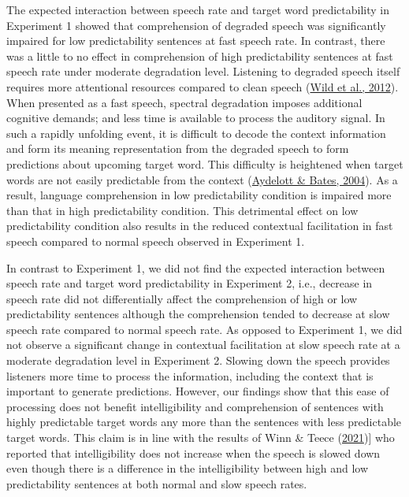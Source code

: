 \documentclass[a4paper, nobind]{templates/ociamthesis}
\begin{document}
The expected interaction between speech rate and target word predictability in Experiment 1 showed that comprehension of degraded speech was significantly impaired for low predictability sentences at fast speech rate. In contrast, there was a little to no effect in comprehension of high predictability sentences at fast speech rate under moderate degradation level.
Listening to degraded speech itself requires more attentional resources compared to clean speech (\protect\hyperlink{ref-Wild2012}{Wild et al., 2012}).
When presented as a fast speech, spectral degradation imposes additional cognitive demands; and less time is available to process the auditory signal.
In such a rapidly unfolding event, it is difficult to decode the context information and form its meaning representation from the degraded speech to form predictions about upcoming target word.
This difficulty is heightened when target words are not easily predictable from the context (\protect\hyperlink{ref-Aydelott2004}{Aydelott \& Bates, 2004}).
As a result, language comprehension in low predictability condition is impaired more than that in high predictability condition.
This detrimental effect on low predictability condition also results in the reduced contextual facilitation in fast speech compared to normal speech observed in Experiment 1.

In contrast to Experiment 1, we did not find the expected interaction between speech rate and target word predictability in Experiment 2,
i.e., decrease in speech rate did not differentially affect the comprehension of high or low predictability sentences although the comprehension tended to decrease at slow speech rate compared to normal speech rate.
As opposed to Experiment 1, we did not observe a significant change in contextual facilitation at slow speech rate at a moderate degradation level in Experiment 2.
Slowing down the speech provides listeners more time to process the information, including the context that is important to generate predictions.
However, our findings show that this ease of processing does not benefit intelligibility and comprehension of sentences with highly predictable target words any more than the sentences with less predictable target words.
This claim is in line with the results of Winn \& Teece (\protect\hyperlink{ref-Winn2021b}{2021}){]} who reported that intelligibility does not increase when the speech is slowed down even though there is a difference in the intelligibility between high and low predictability sentences at both normal and slow speech rates.
\end{document}
